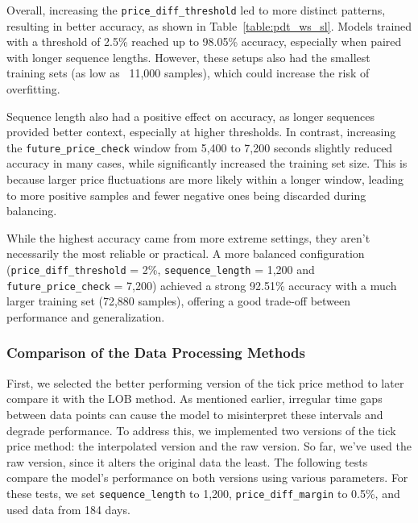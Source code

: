 \documentclass[a4paper,oneside,onecolumn,12pt]{book}
\begin{document}
		Overall, increasing the \texttt{price\_diff\_threshold} led to more distinct patterns, resulting in better accuracy, as shown in Table~\ref{table:pdt_ws_sl}. Models trained with a threshold of 2.5\% reached up to 98.05\% accuracy, especially when paired with longer sequence lengths. However, these setups also had the smallest training sets (as low as ~11,000 samples), which could increase the risk of overfitting.

		Sequence length also had a positive effect on accuracy, as longer sequences provided better context, especially at higher thresholds. In contrast, increasing the \texttt{future\_price\_check} window from 5,400 to 7,200 seconds slightly reduced accuracy in many cases, while significantly increased the training set size. This is because larger price fluctuations are more likely within a longer window, leading to more positive samples and fewer negative ones being discarded during balancing.

		While the highest accuracy came from more extreme settings, they aren't necessarily the most reliable or practical. A more balanced configuration (\texttt{price\_diff\_threshold} = 2\%, \texttt{sequence\_length} = 1,200 and \texttt{future\_price\_check} = 7,200) achieved a strong 92.51\% accuracy with a much larger training set (72,880 samples), offering a good trade-off between performance and generalization.

		\subsubsection{Comparison of the Data Processing Methods}
		First, we selected the better performing version of the tick price method to later compare it with the LOB method. As mentioned earlier, irregular time gaps between data points can cause the model to misinterpret these intervals and degrade performance. To address this, we implemented two versions of the tick price method: the interpolated version and the raw version. So far, we've used the raw version, since it alters the original data the least. The following tests compare the model's performance on both versions using various parameters. For these tests, we set \texttt{sequence\_length} to 1,200, \texttt{price\_diff\_margin} to 0.5\%, and used data from 184 days.
\end{document}
